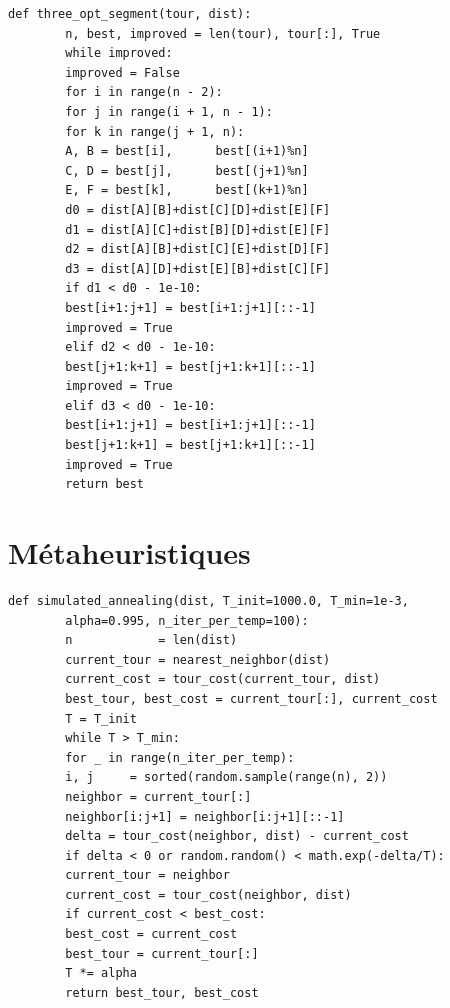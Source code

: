 \documentclass[12pt, a4paper, twoside, openright]{book}
\begin{document}
	\begin{lstlisting}[caption={Recherche locale 3-opt simplifiée. Complexité cubique pour l'examen des triplets, par balayage.}, label={lst:3opt}]
		def three_opt_segment(tour, dist):
		n, best, improved = len(tour), tour[:], True
		while improved:
		improved = False
		for i in range(n - 2):
		for j in range(i + 1, n - 1):
		for k in range(j + 1, n):
		A, B = best[i],      best[(i+1)%n]
		C, D = best[j],      best[(j+1)%n]
		E, F = best[k],      best[(k+1)%n]
		d0 = dist[A][B]+dist[C][D]+dist[E][F]
		d1 = dist[A][C]+dist[B][D]+dist[E][F]
		d2 = dist[A][B]+dist[C][E]+dist[D][F]
		d3 = dist[A][D]+dist[E][B]+dist[C][F]
		if d1 < d0 - 1e-10:
		best[i+1:j+1] = best[i+1:j+1][::-1]
		improved = True
		elif d2 < d0 - 1e-10:
		best[j+1:k+1] = best[j+1:k+1][::-1]
		improved = True
		elif d3 < d0 - 1e-10:
		best[i+1:j+1] = best[i+1:j+1][::-1]
		best[j+1:k+1] = best[j+1:k+1][::-1]
		improved = True
		return best
	\end{lstlisting}
	
	\section{Métaheuristiques}
	\label{ann:metaheuristiques}
	
	\begin{lstlisting}[caption={Recuit simulé (Simulated Annealing).}, label={lst:sa}]
		def simulated_annealing(dist, T_init=1000.0, T_min=1e-3,
		alpha=0.995, n_iter_per_temp=100):
		n            = len(dist)
		current_tour = nearest_neighbor(dist)
		current_cost = tour_cost(current_tour, dist)
		best_tour, best_cost = current_tour[:], current_cost
		T = T_init
		while T > T_min:
		for _ in range(n_iter_per_temp):
		i, j     = sorted(random.sample(range(n), 2))
		neighbor = current_tour[:]
		neighbor[i:j+1] = neighbor[i:j+1][::-1]
		delta = tour_cost(neighbor, dist) - current_cost
		if delta < 0 or random.random() < math.exp(-delta/T):
		current_tour = neighbor
		current_cost = tour_cost(neighbor, dist)
		if current_cost < best_cost:
		best_cost = current_cost
		best_tour = current_tour[:]
		T *= alpha
		return best_tour, best_cost
	\end{lstlisting}
	
\end{document}
